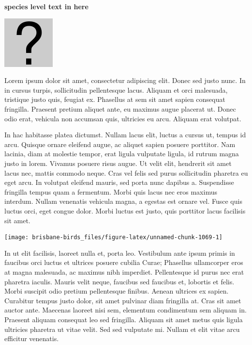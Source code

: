 \documentclass[]{book}
\let\origfigure\figure
\let\endorigfigure\endfigure
\renewenvironment{figure}[1][2] {
  \expandafter\origfigure\expandafter[H]
} {
  \endorigfigure
}
\begin{document}
\textbf{species level text in here}

\begin{figure}
\centering
\includegraphics{assets/missing.png}
\caption{No image for species}
\end{figure}

Lorem ipsum dolor sit amet, consectetur adipiscing elit. Donec sed justo
nunc. In in cursus turpis, sollicitudin pellentesque lacus. Aliquam et
orci malesuada, tristique justo quis, feugiat ex. Phasellus at sem sit
amet sapien consequat fringilla. Praesent pretium aliquet ante, eu
maximus augue placerat ut. Donec odio erat, vehicula non accumsan quis,
ultricies eu arcu. Aliquam erat volutpat.

In hac habitasse platea dictumst. Nullam lacus elit, luctus a cursus ut,
tempus id arcu. Quisque ornare eleifend augue, ac aliquet sapien posuere
porttitor. Nam lacinia, diam at molestie tempor, erat ligula vulputate
ligula, id rutrum magna justo in lorem. Vivamus posuere risus augue. Ut
velit elit, hendrerit sit amet lacus nec, mattis commodo neque. Cras vel
felis sed purus sollicitudin pharetra eu eget arcu. In volutpat eleifend
mauris, sed porta nunc dapibus a. Suspendisse fringilla tempus quam a
fermentum. Morbi quis lacus nec eros maximus interdum. Nullam venenatis
vehicula magna, a egestas est ornare vel. Fusce quis luctus orci, eget
congue dolor. Morbi luctus est justo, quis porttitor lacus facilisis sit
amet.

\begin{figure}
\texttt{[image: brisbane-birds\_files/figure-latex/unnamed-chunk-1069-1]} \caption{insert figure caption}\label{fig:unnamed-chunk-1069}
\end{figure}

In ut elit facilisis, laoreet nulla et, porta leo. Vestibulum ante ipsum
primis in faucibus orci luctus et ultrices posuere cubilia Curae;
Phasellus ullamcorper eros at magna malesuada, ac maximus nibh
imperdiet. Pellentesque id purus nec erat pharetra iaculis. Mauris velit
neque, faucibus sed faucibus et, lobortis et felis. Morbi suscipit odio
pretium pellentesque finibus. Aenean ultrices ex sapien. Curabitur
tempus justo dolor, sit amet pulvinar diam fringilla at. Cras sit amet
auctor ante. Maecenas laoreet nisi sem, elementum condimentum sem
aliquam in. Praesent aliquam consequat leo sed fringilla. Aliquam sit
amet metus quis ligula ultricies pharetra ut vitae velit. Sed sed
vulputate mi. Nullam et elit vitae arcu efficitur venenatis.
\end{document}
